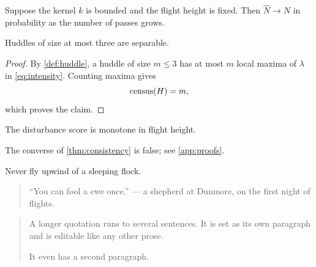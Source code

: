 \begin{theorem}[Consistency]
\label{thm:consistency}
Suppose the kernel $k$ is bounded and the flight height is fixed. Then $\hat{N} \to N$ in probability as the number of passes grows.
\end{theorem}

\begin{lemma}
Huddles of size at most three are separable.
\end{lemma}

\begin{proof}
By \cref{def:huddle}, a huddle of size $m \le 3$ has at most $m$ local maxima of $\lambda$ in \eqref{eq:intensity}. Counting maxima gives
\[
  \operatorname{census}(H) = m ,
\]
which proves the claim.
\end{proof}

\begin{proposition}
The disturbance score is monotone in flight height.
\end{proposition}

\begin{remark}
The converse of \cref{thm:consistency} is false; see \cref{app:proofs}.
\end{remark}

\begin{flockrule}
Never fly upwind of a sleeping flock.
\end{flockrule}

\begin{quote}
``You can fool a ewe once.'' --- a shepherd at Dunmore, on the first night of flights.
\end{quote}

\begin{quotation}
A longer quotation runs to several sentences. It is set as its own paragraph and is editable like any other prose.

It even has a second paragraph.
\end{quotation}
